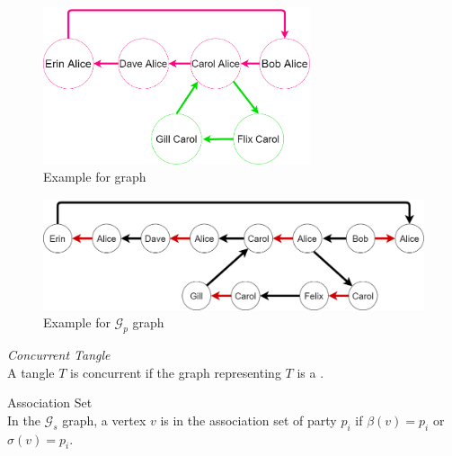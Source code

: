 \begin{figure}
    \centering
    \includegraphics[width=0.7\textwidth]{figures/gen-graph.png}
    \caption{Example for \genGraph graph}
    \label{fig:gen-graph}
\end{figure}

\begin{figure}
    \centering
    \includegraphics[width=\textwidth]{figures/prin-flow-graph.png}
    \caption{Example for $\mathcal{G}_{p}$ graph}
    \label{fig:prin-flow-graph}
\end{figure}



\begin{definition}{\it Concurrent Tangle}\\
A tangle $T$ is concurrent if the \genGraph graph representing $T$ is a \scdg.
\end{definition}


\begin{definition}{ Association Set}\\
In the $\mathcal{G}_s$ graph, a vertex $v$ is in the association set of party $p_i$ if $\beta(v) = p_i$ or $\sigma(v) = p_i$.

\end{definition}

